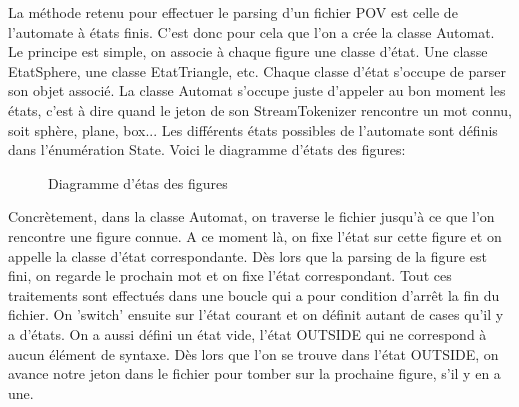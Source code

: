 \documentclass[../../Rapport RayTracer]{subfiles}
\begin{document}
La méthode retenu pour effectuer le parsing d'un fichier POV est celle de l'automate à états finis. C'est donc pour cela que l'on a crée la classe Automat. Le principe est simple, on associe à chaque figure une classe d'état. Une classe EtatSphere, une classe EtatTriangle, etc. Chaque classe d'état s'occupe de parser son objet associé. La classe Automat s'occupe juste d'appeler au bon moment les états, c'est à dire quand le jeton de son StreamTokenizer rencontre un mot connu, soit sphère, plane, box... Les différents états possibles de l'automate sont définis dans l'énumération State. 
Voici le diagramme d'états des figures:

\begin{figure}[h!]
	
	\caption{Diagramme d'étas des figures}
	\label{diagrammeEtatFigure}
\end{figure}
\FloatBarrier


Concrètement, dans la classe Automat, on traverse le fichier jusqu'à ce que l'on rencontre une figure connue.
A ce moment là, on fixe l'état sur cette figure et on appelle la classe d'état correspondante. Dès lors que la parsing de la figure est fini,
on regarde le prochain mot et on fixe l'état correspondant. Tout ces traitements sont effectués dans une boucle qui a pour condition d'arrêt la fin du fichier.
On 'switch' ensuite sur l'état courant et on définit autant de cases qu'il y a d'états.
On a aussi défini un état vide, l'état OUTSIDE qui ne correspond à aucun élément de syntaxe. Dès lors que l'on se trouve dans l'état OUTSIDE,
on avance notre jeton dans le fichier pour tomber sur la prochaine figure, s'il y en a une.
\end{document}
